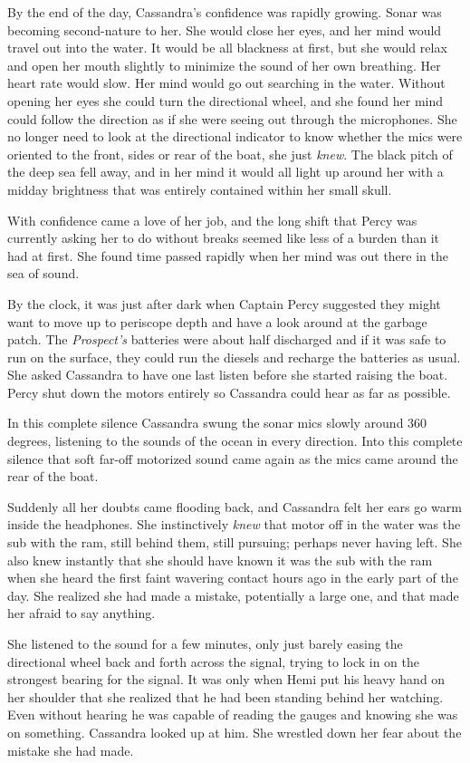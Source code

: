 \documentclass[
]{scrbook}
\begin{document}
By the end of the day, Cassandra's confidence was rapidly growing. Sonar
was becoming second-nature to her. She would close her eyes, and her
mind would travel out into the water. It would be all blackness at
first, but she would relax and open her mouth slightly to minimize the
sound of her own breathing. Her heart rate would slow. Her mind would go
out searching in the water. Without opening her eyes she could turn the
directional wheel, and she found her mind could follow the direction as
if she were seeing out through the microphones. She no longer need to
look at the directional indicator to know whether the mics were oriented
to the front, sides or rear of the boat, she just \emph{knew}. The black
pitch of the deep sea fell away, and in her mind it would all light up
around her with a midday brightness that was entirely contained within
her small skull.

With confidence came a love of her job, and the long shift that Percy
was currently asking her to do without breaks seemed like less of a
burden than it had at first. She found time passed rapidly when her mind
was out there in the sea of sound.

By the clock, it was just after dark when Captain Percy suggested they
might want to move up to periscope depth and have a look around at the
garbage patch. The \emph{Prospect's} batteries were about half
discharged and if it was safe to run on the surface, they could run the
diesels and recharge the batteries as usual. She asked Cassandra to have
one last listen before she started raising the boat. Percy shut down the
motors entirely so Cassandra could hear as far as possible.

In this complete silence Cassandra swung the sonar mics slowly around
360 degrees, listening to the sounds of the ocean in every direction.
Into this complete silence that soft far-off motorized sound came again
as the mics came around the rear of the boat.

Suddenly all her doubts came flooding back, and Cassandra felt her ears
go warm inside the headphones. She instinctively \emph{knew} that motor
off in the water was the sub with the ram, still behind them, still
pursuing; perhaps never having left. She also knew instantly that she
should have known it was the sub with the ram when she heard the first
faint wavering contact hours ago in the early part of the day. She
realized she had made a mistake, potentially a large one, and that made
her afraid to say anything.

She listened to the sound for a few minutes, only just barely easing the
directional wheel back and forth across the signal, trying to lock in on
the strongest bearing for the signal. It was only when Hemi put his
heavy hand on her shoulder that she realized that he had been standing
behind her watching. Even without hearing he was capable of reading the
gauges and knowing she was on something. Cassandra looked up at him. She
wrestled down her fear about the mistake she had made.
\end{document}
